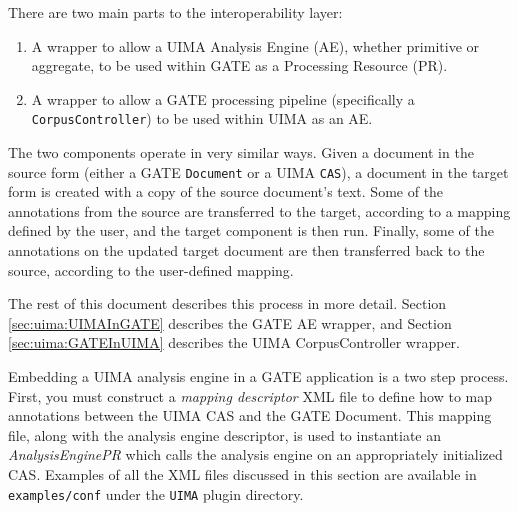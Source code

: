 There are two main parts to the interoperability layer:
%
\begin{enumerate}
\item A wrapper to allow a UIMA Analysis Engine (AE), whether primitive
or aggregate, to be used within GATE as a Processing Resource (PR).
\item A wrapper to allow a GATE processing pipeline (specifically a
\texttt{CorpusController}) to be used within UIMA as an AE.
\end{enumerate}
%
The two components operate in very similar ways.  Given a document in the
source form (either a GATE \texttt{Document} or a UIMA \texttt{CAS}), a
document in the target form is created with a copy of the source document's
text.  Some of the annotations from the source are transferred to the target,
according to a mapping defined by the user, and the target component is then
run.  Finally, some of the annotations on the updated target document are then
transferred back to the source, according to the user-defined mapping.

The rest of this document describes this process in more detail.  Section
\ref{sec:uima:UIMAInGATE} describes the GATE AE wrapper, and Section
\ref{sec:uima:GATEInUIMA} describes the UIMA CorpusController wrapper.


Embedding a UIMA analysis engine in a GATE application is a two step
process.  First, you must construct a \emph{mapping descriptor} XML file to
define how to map annotations between the UIMA CAS and the GATE Document.  This
mapping file, along with the analysis engine descriptor, is used to instantiate
an \emph{AnalysisEnginePR} which calls the analysis engine on an appropriately
initialized CAS.  Examples of all the XML files discussed in this section are
available in \texttt{examples/conf} under the \texttt{UIMA} plugin directory.


